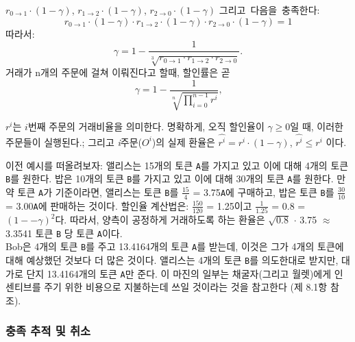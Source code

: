 \documentclass{article}
\begin{document}
\begin{multicols}{2}
$r_{0\rightarrow 1} \cdot (1-\gamma)$, $r_{1\rightarrow 2} \cdot (1-\gamma)$, $r_{2 \rightarrow 0} \cdot (1-\gamma)$
그리고\ 다음을\ 충족한다:\\
\begin{equation}
r_{0\rightarrow 1} \cdot (1-\gamma)\cdot r_{1\rightarrow 2} \cdot (1-\gamma) \cdot r_{2 \rightarrow 0} \cdot (1-\gamma) = 1
\end{equation}
따라서:\\
\begin{equation}
\gamma = 1- \frac{1}{\sqrt[3]{r_{0\rightarrow 1} \cdot r_{1\rightarrow 2} \cdot r_{2\rightarrow 0}}}\text{.}
\end{equation}
\indent 거래가 n개의 주문에 걸쳐 이뤄진다고 할때, 할인률은 곧\\
\begin{equation}
\gamma = 1- \frac{1}{\sqrt[n]{\prod_{i=0}^{n-1} r^i}} \text{,}
\end{equation}

 $r^i$는 $i$번째 주문의 거래비율을 의미한다. 명확하게, 오직 할인율이 $\gamma \ge 0$일 때, 이러한 주문들이 실행된다.; 그리고 \textit{i}주문($O^i$)의 실제 환율은 $\hat{r^i} = r^i \cdot (1-\gamma)$, $\hat{r^i}\le r^i$ 이다.
 
 이전 예시를 떠올려보자: 앨리스는 15개의 토큰 \verb|A|를 가지고 있고 이에 대해 4개의 토큰 \verb|B|를 원한다. 밥은 10개의 토큰 \verb|B|를 가지고 있고 이에 대해 30개의 토큰 \verb|A|를 원한다. 만약 토큰 \verb|A|가 기준이라면, 앨리스는 토큰 \verb|B|를 $\frac{15}{4}$ = 3.75\verb|A|에 구매하고, 밥은 토큰 \verb|B|를 $\frac{30}{10}$ = 3.00\verb|A|에 판매하는 것이다. 할인율 계산법은: $\frac{150}{120}$ = 1.25이고 $\frac{1}{1.25}$ = 0.8 = $(1 −- \gamma)^2$다. 따라서, 양측이 공정하게 거래하도록 하는 환율은 $\sqrt{0.8}$ $\cdot$ 3.75 $\approx$ 3.3541 토큰 \verb|B| 당 토큰 \verb|A|이다.\\
 
 Bob은 4개의 토큰 \verb|B|를 주고 13.4164개의 토큰 \verb|A|를 받는데, 이것은 그가 4개의 토큰에 대해 예상했던 것보다 더 많은 것이다. 앨리스는 4개의 토큰 \verb|B|를 의도한대로 받지만, 대가로 단지 13.4164개의 토큰 \verb|A|만 준다. 이 마진의 일부는 채굴자(그리고 월렛)에게 인센티브를 주기 위한 비용으로 지불하는데 쓰일 것이라는 것을 참고한다 (제 8.1항 참조).
 
\subsubsection{충족 추적 및 취소}


\end{multicols}
\end{document}
